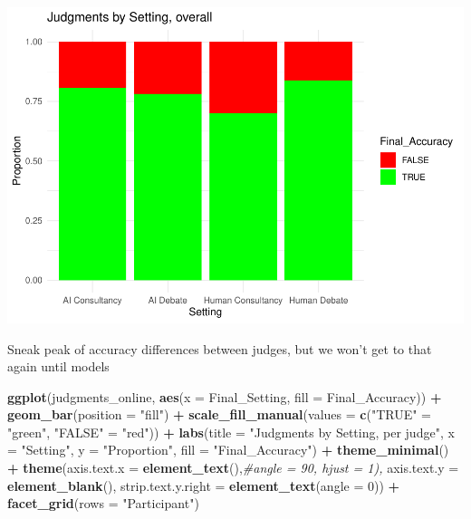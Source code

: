 \documentclass[
]{article}
\newenvironment{Shaded}{\begin{snugshade}}{\end{snugshade}}
\newcommand{\AttributeTok}[1]{\textcolor[rgb]{0.13,0.29,0.53}{#1}}
\newcommand{\CommentTok}[1]{\textcolor[rgb]{0.56,0.35,0.01}{\textit{#1}}}
\newcommand{\DecValTok}[1]{\textcolor[rgb]{0.00,0.00,0.81}{#1}}
\newcommand{\FunctionTok}[1]{\textcolor[rgb]{0.13,0.29,0.53}{\textbf{#1}}}
\newcommand{\NormalTok}[1]{#1}
\newcommand{\OtherTok}[1]{\textcolor[rgb]{0.56,0.35,0.01}{#1}}
\newcommand{\SpecialCharTok}[1]{\textcolor[rgb]{0.81,0.36,0.00}{\textbf{#1}}}
\newcommand{\StringTok}[1]{\textcolor[rgb]{0.31,0.60,0.02}{#1}}
\begin{document}
\includegraphics[width=1\linewidth]{debate-2309_files/figure-latex/quick ori acc stats-1}

Sneak peak of accuracy differences between judges, but we won't get to
that again until models

\begin{Shaded}
\begin{Highlighting}[]
\FunctionTok{ggplot}\NormalTok{(judgments\_online, }\FunctionTok{aes}\NormalTok{(}\AttributeTok{x =}\NormalTok{ Final\_Setting, }\AttributeTok{fill =}\NormalTok{ Final\_Accuracy)) }\SpecialCharTok{+}
  \FunctionTok{geom\_bar}\NormalTok{(}\AttributeTok{position =} \StringTok{"fill"}\NormalTok{) }\SpecialCharTok{+}
  \FunctionTok{scale\_fill\_manual}\NormalTok{(}\AttributeTok{values =} \FunctionTok{c}\NormalTok{(}\StringTok{"TRUE"} \OtherTok{=} \StringTok{"green"}\NormalTok{, }\StringTok{"FALSE"} \OtherTok{=} \StringTok{"red"}\NormalTok{)) }\SpecialCharTok{+}
  \FunctionTok{labs}\NormalTok{(}\AttributeTok{title =} \StringTok{"Judgments by Setting, per judge"}\NormalTok{, }\AttributeTok{x =} \StringTok{"Setting"}\NormalTok{, }\AttributeTok{y =} \StringTok{"Proportion"}\NormalTok{, }\AttributeTok{fill =} \StringTok{"Final\_Accuracy"}\NormalTok{) }\SpecialCharTok{+}
  \FunctionTok{theme\_minimal}\NormalTok{() }\SpecialCharTok{+}
  \FunctionTok{theme}\NormalTok{(}\AttributeTok{axis.text.x =} \FunctionTok{element\_text}\NormalTok{(),}\CommentTok{\#angle = 90, hjust = 1),}
        \AttributeTok{axis.text.y =} \FunctionTok{element\_blank}\NormalTok{(),}
        \AttributeTok{strip.text.y.right =} \FunctionTok{element\_text}\NormalTok{(}\AttributeTok{angle =} \DecValTok{0}\NormalTok{)) }\SpecialCharTok{+}
  \FunctionTok{facet\_grid}\NormalTok{(}\AttributeTok{rows =} \StringTok{"Participant"}\NormalTok{)}
\end{Highlighting}
\end{Shaded}
\end{document}
